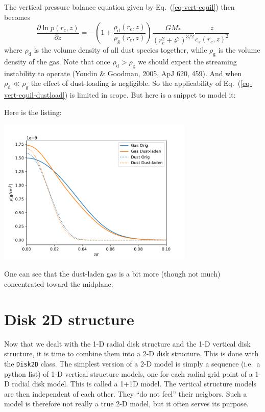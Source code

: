 \documentclass{book}
\newcommand{\code}[1]{{\small\tt #1}}
\begin{document}
The vertical pressure balance equation given by Eq.~(\ref{eq-vert-equil}) then
becomes
\begin{equation}\label{eq-vert-equil-dustload}
  \frac{\partial \ln p(r_c,z)}{\partial z} = -\left(1+
  \frac{\rho_{\mathrm{d}}(r_c,z)}{\rho_{\mathrm{g}}(r_c,z)}\right)
  \frac{GM_{*}}{(r_c^2+z^2)^{3/2}}\frac{z}{c_s(r_c,z)^2}
\end{equation}
where $\rho_{\mathrm{d}}$ is the volume density of all dust species together,
while $\rho_{\mathrm{g}}$ is the volume density of the gas. Note that once
$\rho_{\mathrm{d}}>\rho_{\mathrm{g}}$ we should expect the streaming instability
to operate (Youdin \& Goodman, 2005, ApJ 620, 459). And when
$\rho_{\mathrm{d}}\ll\rho_{\mathrm{g}}$ the effect of dust-loading is negligible.
So the applicability of Eq.~(\ref{eq-vert-equil-dustload}) is limited in
scope. But here is a snippet to model it:
\begin{codebox}
\end{codebox}
Here is the listing:

\centerline{\includegraphics[width=0.7\textwidth]{../snippets/fig_snippet_vertstruct_dustload_1_1.pdf}}

One can see that the dust-laden gas is a bit more (though not much) concentrated
toward the midplane. 

\newpage

\chapter{Disk 2D structure}
\label{chap-2d-structure}
Now that we dealt with the 1-D radial disk structure and the 1-D vertical disk
structure, it is time to combine them into a 2-D disk structure. This is done
with the \code{Disk2D} class. The simplest version of a 2-D model is simply a
sequence (i.e.\ a python list) of 1-D vertical structure models, one for each
radial grid point of a 1-D radial disk model. This is called a 1+1D model. The
vertical structure models are then independent of each other. They ``do not
feel'' their neigbors.  Such a model is therefore not really a true 2-D model,
but it often serves its purpose.
\end{document}
